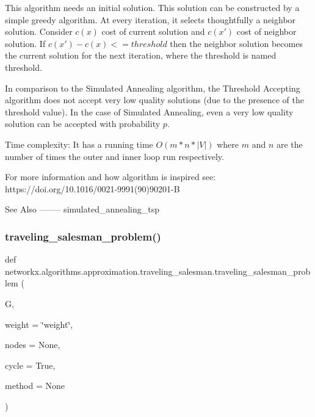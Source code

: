 \begin{DoxyVerb}
This algorithm needs an initial solution. This solution can be
constructed by a simple greedy algorithm. At every iteration, it
selects thoughtfully a neighbor solution.
Consider $c(x)$ cost of current solution and $c(x')$ cost of
neighbor solution.
If $c(x') - c(x) <= threshold$ then the neighbor solution becomes the current
solution for the next iteration, where the threshold is named threshold.

In comparison to the Simulated Annealing algorithm, the Threshold
Accepting algorithm does not accept very low quality solutions
(due to the presence of the threshold value). In the case of
Simulated Annealing, even a very low quality solution can
be accepted with probability $p$.

Time complexity:
It has a running time $O(m * n * |V|)$ where $m$ and $n$ are the number
of times the outer and inner loop run respectively.

For more information and how algorithm is inspired see:
https://doi.org/10.1016/0021-9991(90)90201-B

See Also
--------
simulated_annealing_tsp\end{DoxyVerb}
 \mbox{\label{namespacenetworkx_1_1algorithms_1_1approximation_1_1traveling__salesman_a2c82677b10d52786a34aa0ea42f8b1d2}} 
\subsubsection{\texorpdfstring{traveling\+\_\+salesman\+\_\+problem()}{traveling\_salesman\_problem()}}
{\footnotesize\ttfamily def networkx.\+algorithms.\+approximation.\+traveling\+\_\+salesman.\+traveling\+\_\+salesman\+\_\+problem (\begin{DoxyParamCaption}\item[{}]{G,  }\item[{}]{weight = {\ttfamily \char`\"{}weight\char`\"{}},  }\item[{}]{nodes = {\ttfamily None},  }\item[{}]{cycle = {\ttfamily True},  }\item[{}]{method = {\ttfamily None} }\end{DoxyParamCaption})}

